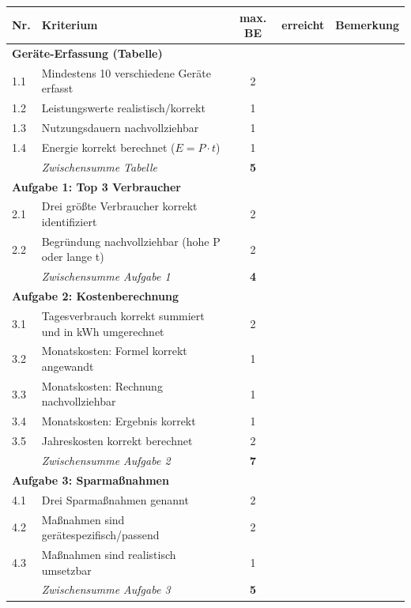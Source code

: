 \documentclass[11pt, a4paper]{article}
\begin{document}
\begin{tabularx}{\textwidth}{|p{0.5cm}|X|c|c|c|}
\hline
\textbf{Nr.} & \textbf{Kriterium} & \textbf{max. BE} & \textbf{erreicht} & \textbf{Bemerkung} \\
\hline
\hline
\multicolumn{5}{|l|}{\cellcolor{hellgrau}\textbf{Geräte-Erfassung (Tabelle)}} \\
\hline
1.1 & Mindestens 10 verschiedene Geräte erfasst & 2 & & \\
\hline
1.2 & Leistungswerte realistisch/korrekt & 1 & & \\
\hline
1.3 & Nutzungsdauern nachvollziehbar & 1 & & \\
\hline
1.4 & Energie korrekt berechnet ($E = P \cdot t$) & 1 & & \\
\hline
& \textit{Zwischensumme Tabelle} & \textbf{5} & & \\
\hline
\hline
\multicolumn{5}{|l|}{\cellcolor{hellgrau}\textbf{Aufgabe 1: Top 3 Verbraucher}} \\
\hline
2.1 & Drei größte Verbraucher korrekt identifiziert & 2 & & \\
\hline
2.2 & Begründung nachvollziehbar (hohe P oder lange t) & 2 & & \\
\hline
& \textit{Zwischensumme Aufgabe 1} & \textbf{4} & & \\
\hline
\hline
\multicolumn{5}{|l|}{\cellcolor{hellgrau}\textbf{Aufgabe 2: Kostenberechnung}} \\
\hline
3.1 & Tagesverbrauch korrekt summiert und in kWh umgerechnet & 2 & & \\
\hline
3.2 & Monatskosten: Formel korrekt angewandt & 1 & & \\
\hline
3.3 & Monatskosten: Rechnung nachvollziehbar & 1 & & \\
\hline
3.4 & Monatskosten: Ergebnis korrekt & 1 & & \\
\hline
3.5 & Jahreskosten korrekt berechnet & 2 & & \\
\hline
& \textit{Zwischensumme Aufgabe 2} & \textbf{7} & & \\
\hline
\hline
\multicolumn{5}{|l|}{\cellcolor{hellgrau}\textbf{Aufgabe 3: Sparmaßnahmen}} \\
\hline
4.1 & Drei Sparmaßnahmen genannt & 2 & & \\
\hline
4.2 & Maßnahmen sind gerätespezifisch/passend & 2 & & \\
\hline
4.3 & Maßnahmen sind realistisch umsetzbar & 1 & & \\
\hline
& \textit{Zwischensumme Aufgabe 3} & \textbf{5} & & \\

\end{tabularx}
\end{document}
